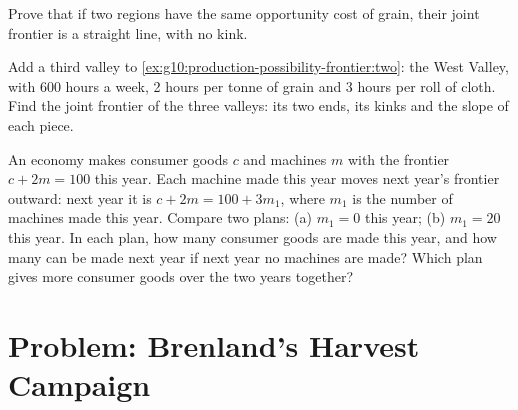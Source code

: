 \begin{exercise}[$\star\star\star$]\label{exo:g10:production-possibility-frontier:13}
Prove that if two regions have the same opportunity cost of grain, their joint frontier is a straight
line, with no kink.
\end{exercise}

\begin{exercise}[$\star\star\star$]\label{exo:g10:production-possibility-frontier:14}
Add a third valley to \cref{ex:g10:production-possibility-frontier:two}: the West Valley, with 600 hours a
week, 2 hours per tonne of grain and 3 hours per roll of cloth. Find the joint frontier of the three
valleys: its two ends, its kinks and the slope of each piece.
\end{exercise}

\begin{exercise}[$\star\star\star$]\label{exo:g10:production-possibility-frontier:15}
An economy makes consumer goods $c$ and machines $m$ with the frontier $c + 2m = 100$ this year. Each
machine made this year moves next year's frontier outward: next year it is $c + 2m = 100 + 3m_1$, where
$m_1$ is the number of machines made this year. Compare two plans: (a) $m_1 = 0$ this year; (b) $m_1 =
20$ this year. In each plan, how many consumer goods are made this year, and how many can be made next
year if next year no machines are made? Which plan gives more consumer goods over the two years
together?
\end{exercise}

\section{Problem: Brenland's Harvest Campaign}

